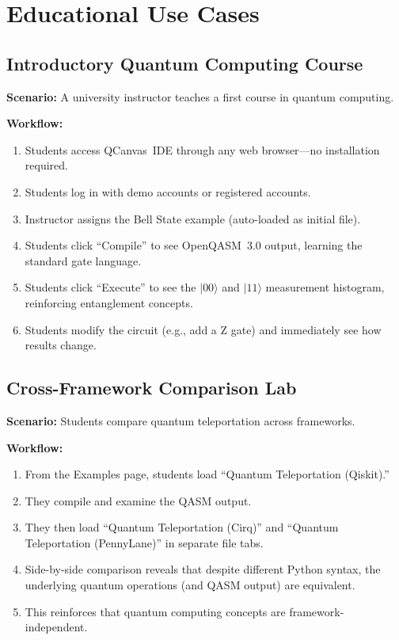 \documentclass[conference]{IEEEtran}
\begin{document}
\section{Educational Use Cases}
\label{sec:usecases}

\subsection{Introductory Quantum Computing Course}

\textbf{Scenario:} A university instructor teaches a first course in quantum computing.

\textbf{Workflow:}
\begin{enumerate}
    \item Students access QCanvas~IDE through any web browser---no installation required.
    \item Students log in with demo accounts or registered accounts.
    \item Instructor assigns the Bell State example (auto-loaded as initial file).
    \item Students click ``Compile'' to see OpenQASM~3.0 output, learning the standard gate language.
    \item Students click ``Execute'' to see the $|00\rangle$ and $|11\rangle$ measurement histogram, reinforcing entanglement concepts.
    \item Students modify the circuit (e.g., add a Z gate) and immediately see how results change.
\end{enumerate}

\subsection{Cross-Framework Comparison Lab}

\textbf{Scenario:} Students compare quantum teleportation across frameworks.

\textbf{Workflow:}
\begin{enumerate}
    \item From the Examples page, students load ``Quantum Teleportation (Qiskit).''
    \item They compile and examine the QASM output.
    \item They then load ``Quantum Teleportation (Cirq)'' and ``Quantum Teleportation (PennyLane)'' in separate file tabs.
    \item Side-by-side comparison reveals that despite different Python syntax, the underlying quantum operations (and QASM output) are equivalent.
    \item This reinforces that quantum computing concepts are framework-independent.
\end{enumerate}
\end{document}
